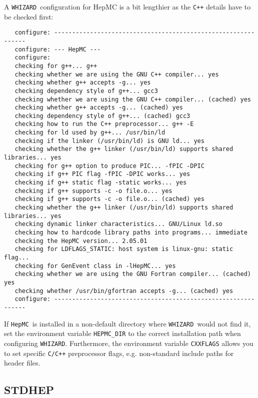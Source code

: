\documentclass[12pt]{book}
\newcommand{\ttt}[1]{\texttt{#1}}
\newcommand{\whizard}{\texttt{WHIZARD}}
\newcommand{\hepmc}{\texttt{HepMC}}
\begin{document}
A \whizard\ configuration for HepMC is a bit lengthier as the
\ttt{C++} details have to be checked first:
\begin{footnotesize}
  \begin{verbatim}
   configure: --------------------------------------------------------------
   configure: --- HepMC ---
   configure:
   checking for g++... g++
   checking whether we are using the GNU C++ compiler... yes
   checking whether g++ accepts -g... yes
   checking dependency style of g++... gcc3
   checking whether we are using the GNU C++ compiler... (cached) yes
   checking whether g++ accepts -g... (cached) yes
   checking dependency style of g++... (cached) gcc3
   checking how to run the C++ preprocessor... g++ -E
   checking for ld used by g++... /usr/bin/ld
   checking if the linker (/usr/bin/ld) is GNU ld... yes
   checking whether the g++ linker (/usr/bin/ld) supports shared libraries... yes
   checking for g++ option to produce PIC... -fPIC -DPIC
   checking if g++ PIC flag -fPIC -DPIC works... yes
   checking if g++ static flag -static works... yes
   checking if g++ supports -c -o file.o... yes
   checking if g++ supports -c -o file.o... (cached) yes
   checking whether the g++ linker (/usr/bin/ld) supports shared libraries... yes
   checking dynamic linker characteristics... GNU/Linux ld.so
   checking how to hardcode library paths into programs... immediate
   checking the HepMC version... 2.05.01
   checking for LDFLAGS_STATIC: host system is linux-gnu: static flag...
   checking for GenEvent class in -lHepMC... yes
   checking whether we are using the GNU Fortran compiler... (cached) yes
   checking whether /usr/bin/gfortran accepts -g... (cached) yes
   configure: --------------------------------------------------------------    
  \end{verbatim}
\end{footnotesize}

If \hepmc\ is installed in a non-default directory where \whizard\
would not find it, set the environment variable \ttt{HEPMC\_DIR} to
the correct installation path when configuring \whizard.  Furthermore,
the environment variable \ttt{CXXFLAGS} allows you to set specific
\ttt{C/C++} preprocessor flags, e.g. non-standard include paths for
header files.



\subsection{STDHEP}
\label{sec:stdhep}
\end{document}
